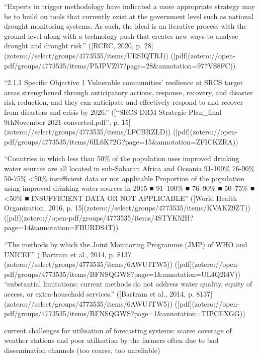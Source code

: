 “Experts in trigger methodology have indicated a more appropriate strategy may be to build on tools that currently exist at the government level such as national drought monitoring systems. As such, the ideal is an iterative process with the ground level along with a technology push that creates new ways to analyse drought and drought risk.” ([RCRC, 2020, p. 28](zotero://select/groups/4773535/items/UESIQTRJ)) ([pdf](zotero://open-pdf/groups/4773535/items/P5JPVZ97?page=28&annotation=977VS8FC))

“2.1.1 Specific Objective 1 Vulnerable communities’ resilience at SRCS target areas strengthened through anticipatory actions, response, recovery, and disaster risk reduction, and they can anticipate and effectively respond to and recover from disasters and crisis by 2026.” ([“SRCS DRM Strategic Plan_final 9thNovember 2021-converted.pdf”, p. 15](zotero://select/groups/4773535/items/LFCBRZLD)) ([pdf](zotero://open-pdf/groups/4773535/items/6IL6K72G?page=15&annotation=ZFICKZRA))


“Countries in which less than 50\% of the population uses improved drinking water sources are all located in sub-Saharan Africa and Oceania 91-100\% 76-90\% 50-75\% <50\% insufficient data or not applicable Proportion of the population using improved drinking water sources in 2015 ■ 91–100\% ■ 76–90\% ■ 50–75\% ■ <50\% ■ INSUFFICIENT DATA OR NOT APPLICABLE” ([World Health Organization, 2016, p. 15](zotero://select/groups/4773535/items/KVAKZ9ZT)) ([pdf](zotero://open-pdf/groups/4773535/items/4STYK52H?page=14\&annotation=FBURDS4T))

“The methods by which the Joint Monitoring Programme (JMP) of WHO and UNICEF” ([Bartram et al., 2014, p. 8137](zotero://select/groups/4773535/items/6AWUJTW5)) ([pdf](zotero://open-pdf/groups/4773535/items/BFNSQGWS?page=1&annotation=UL4Q2I4V))
“substantial limitations: current methods do not address water quality, equity of access, or extra-household services.” ([Bartram et al., 2014, p. 8137](zotero://select/groups/4773535/items/6AWUJTW5)) ([pdf](zotero://open-pdf/groups/4773535/items/BFNSQGWS?page=1&annotation=TIPCEXGG))

current challenges for utilisation of forecasting systems: scarse coverage of weather stations and poor utilisation by the farmers often due to bad dissemination channels  (too coarse, too unreliable)

